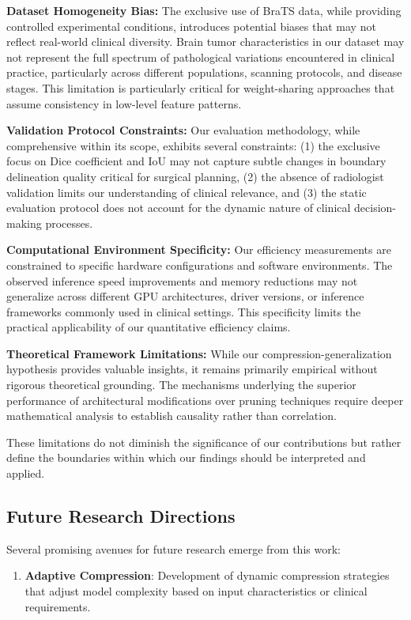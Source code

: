 \documentclass[12pt,a4paper]{article}
\begin{document}
\begin{enumerate}
\textbf{Dataset Homogeneity Bias:} The exclusive use of BraTS data, while providing controlled experimental conditions, introduces potential biases that may not reflect real-world clinical diversity. Brain tumor characteristics in our dataset may not represent the full spectrum of pathological variations encountered in clinical practice, particularly across different populations, scanning protocols, and disease stages. This limitation is particularly critical for weight-sharing approaches that assume consistency in low-level feature patterns.

\textbf{Validation Protocol Constraints:} Our evaluation methodology, while comprehensive within its scope, exhibits several constraints: (1) the exclusive focus on Dice coefficient and IoU may not capture subtle changes in boundary delineation quality critical for surgical planning, (2) the absence of radiologist validation limits our understanding of clinical relevance, and (3) the static evaluation protocol does not account for the dynamic nature of clinical decision-making processes.

\textbf{Computational Environment Specificity:} Our efficiency measurements are constrained to specific hardware configurations and software environments. The observed inference speed improvements and memory reductions may not generalize across different GPU architectures, driver versions, or inference frameworks commonly used in clinical settings. This specificity limits the practical applicability of our quantitative efficiency claims.

\textbf{Theoretical Framework Limitations:} While our compression-generalization hypothesis provides valuable insights, it remains primarily empirical without rigorous theoretical grounding. The mechanisms underlying the superior performance of architectural modifications over pruning techniques require deeper mathematical analysis to establish causality rather than correlation.

These limitations do not diminish the significance of our contributions but rather define the boundaries within which our findings should be interpreted and applied.

\subsection{Future Research Directions}

Several promising avenues for future research emerge from this work:

\begin{enumerate}
\item \textbf{Adaptive Compression}: Development of dynamic compression strategies that adjust model complexity based on input characteristics or clinical requirements.


\end{enumerate}
\end{enumerate}
\end{document}
